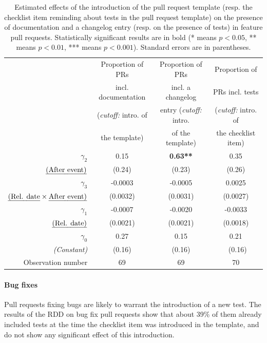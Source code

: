 \begin{table}
	\begin{center}
		\begin{tabular}{|r|c|c|c|}
			\hline
			& Proportion of PRs & Proportion of PRs & Proportion of \\
			& incl. documentation & incl. a changelog & PRs incl. tests \\
			& (\emph{cutoff:} intro. of & entry (\emph{cutoff:} intro. & (\emph{cutoff:} intro. of \\
			& the template) & of the template) & the checklist item) \\
			\hline
			$\gamma_2$ & 0.15 & \textbf{0.63**} & 0.35 \\
			$\mbox{\emph{(After event)}}$ & (0.24) & (0.23) & (0.26) \\
			\hline
			$\gamma_3$ & -0.0003 & -0.0005 & 0.0025 \\
			$\mbox{\emph{(Rel. date}} \times \mbox{\emph{After event)}}$ & (0.0032) & (0.0031) & (0.0027) \\
			\hline
			$\gamma_1$ & -0.0007 & -0.0020 & -0.0033 \\
			$\mbox{\emph{(Rel. date)}}$ & (0.0021) & (0.0021) & (0.0018) \\
			\hline
			$\gamma_0$ & 0.27 & 0.15 & 0.21 \\
			\emph{(Constant)} & (0.16) & (0.16) & (0.16) \\
			\hline
			Observation number & 69 & 69 & 70 \\
			\hline
		\end{tabular}
		\caption{
			Estimated effects of the introduction of the pull request template (resp. the checklist item reminding about tests in the pull request template) on the presence of documentation and a changelog entry (resp. on the presence of tests) in feature pull requests.
			Statistically significant results are in bold (* means $p < 0.05$, ** means $p < 0.01$, *** means $p < 0.001$).
			Standard errors are in parentheses.
		}
		\label{tab:features}
	\end{center}
\end{table}

\paragraph{Bug fixes}

Pull requests fixing bugs are likely to warrant the introduction of a new test.
The results of the RDD on bug fix pull requests show that about 39\% of them already included tests at the time the checklist item was introduced in the template, and do not show any significant effect of this introduction.

